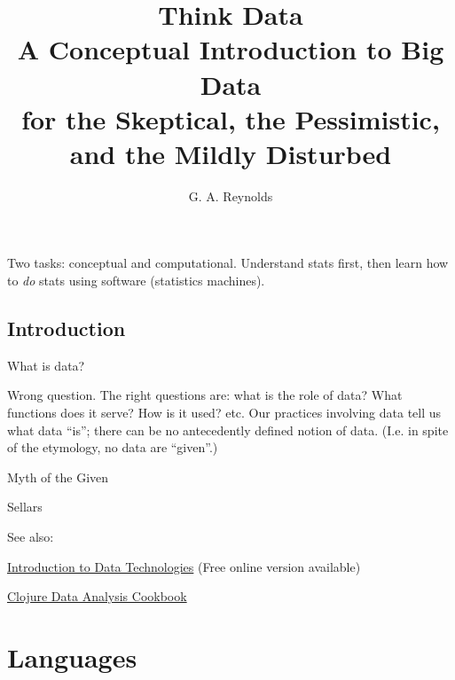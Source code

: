 \documentclass[reqno,12pt]{tufte-book}
\title{Think Data \\
\vspace{12pt}
\Large A Conceptual Introduction to Big Data \\
\vspace{12pt}
\large for the Skeptical, the Pessimistic, and the Mildly Disturbed}
\author{G. A. Reynolds}
\numberwithin{equation}{subsection}
\begin{document}
\maketitle

\begin{remark}
  Two tasks: conceptual and computational.  Understand stats first,
  then learn how to \emph{do} stats using software (statistics
  machines).
\end{remark}

\tableofcontents

\chapter{Introduction}

What is data?

Wrong question.  The right questions are: what is the role of data?
What functions does it serve?  How is it used?  etc.  Our practices
involving data tell us what data ``is''; there can be no antecedently
defined notion of data.  (I.e. in spite of the etymology, no data are
``given''.)

\epigraph{Myth of the Given}{Sellars}


See also:

\href{https://www.stat.auckland.ac.nz/~paul/ItDT/}{Introduction to Data Technologies} (Free online version available)

\href{http://www.ericrochester.com/clj-data-analysis/}{Clojure Data Analysis Cookbook}










\part{Languages}









\end{document}
